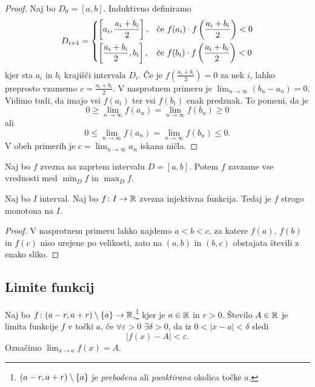 \documentclass[12pt, a4paper]{article}
\begin{document}
\begin{proof}
Naj bo $D_0=[a,b]$. Induktivno definiramo
\[
D_{i+1}=\begin{dcases}
\left[a_i,\frac{a_i+b_i}{2}\right], &\text{če $f(a_i)\cdot f\left(\frac{a_i+b_i}{2}\right)<0$}
\\
\left[\frac{a_i+b_i}{2},b_i\right], &\text{če $f(b_i)\cdot f\left(\frac{a_i+b_i}{2}\right)<0$}
\end{dcases}
\]
kjer sta $a_i$ in $b_i$ krajišči intervala $D_i$. Če je $f\left(\frac{a_i+b_i}{2}\right)=0$ za nek $i$, lahko preprosto vzamemo $c=\frac{a_i+b_i}{2}$. V nasprotnem primeru je $\displaystyle\lim_{n\to\infty}(b_n-a_n)=0$. Vidimo tudi, da imajo vsi $f(a_i)$ ter vsi $f(b_i)$ enak predznak. To pomeni, da je
\[
0\geq \lim_{n\to\infty}f(a_n)=\lim_{n\to\infty}f(b_n)\geq 0
\]
ali
\[
0\leq \lim_{n\to\infty}f(a_n)=\lim_{n\to\infty}f(b_n)\leq 0.
\]
V obeh primerih je $c=\displaystyle\lim_{n\to\infty}a_n$ iskana ničla.
\end{proof}

\begin{posledica}
Naj bo $f$ zvezna na zaprtem intervalu $D=[a,b]$. Potem $f$ zavzame vse vrednosti med $\displaystyle\min_D f$ in $\displaystyle\max_D f$.
\end{posledica}

\begin{posledica}
Naj bo $I$ interval. Naj bo $f\colon I\to\mathbb{R}$ zvezna injektivna funkcija. Tedaj je $f$ strogo monotona na $I$.
\end{posledica}

\begin{proof}
V nasprotnem primeru lahko najdemo $a<b<c$, za katere $f(a)$, $f(b)$ in $f(c)$ niso urejene po velikosti, zato na $(a,b)$ in $(b,c)$ obstajata števili z enako sliko.
\end{proof}

\newpage

\subsection{Limite funkcij}

\begin{okvir}
\begin{definicija}
Naj bo $f\colon(a-r,a+r)\setminus\left\{a\right\}\to\mathbb{R}$,\footnote{$(a-r,a+r)\setminus\left\{a\right\}$ je \emph{prebodena} ali \emph{punktirana} okolica točke $a$.} kjer je $a\in\mathbb{R}$ in $r>0$. Število $A\in\mathbb{R}$ je limita funkcije $f$ v točki $a$, če $\forall\varepsilon>0$ $\exists\delta>0$, da iz $0<|x-a|<\delta$ sledi
\[
\left|f(x)-A\right|<\varepsilon.
\]
Označimo $\displaystyle\lim_{x\to a}f(x)=A$.
\end{definicija}
\end{okvir}
\end{document}
